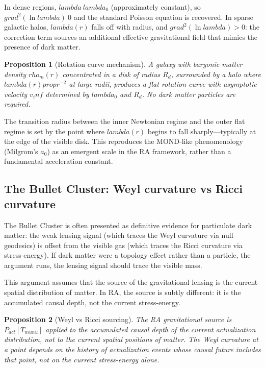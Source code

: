 \documentclass[11pt]{article}
\def\rho{rho}%
\def\mu{mu}%
\def\lambda{lambda}%
\def\nu{nu}%
\def\mathrm#1{#1}%
\def\approx{~}%
\def\infty{inf}%
\def\nabla{grad}%
\def\propto{prop}%
\newtheorem{proposition}{Proposition}
\begin{document}
In dense regions, $\lambda \approx \lambda_0$ (approximately constant), so $\nabla^2(\ln\lambda) \approx 0$ and the standard Poisson equation is recovered. In sparse galactic halos, $\lambda(r)$ falls off with radius, and $\nabla^2(\ln\lambda) > 0$: the correction term sources an additional effective gravitational field that mimics the presence of dark matter.

\begin{proposition}[Rotation curve mechanism]
\label{prop:rotation_curve}
A galaxy with baryonic matter density $\rho_m(r)$ concentrated in a disk of radius $R_d$, surrounded by a halo where $\lambda(r) \propto r^{-2}$ at large radii, produces a flat rotation curve with asymptotic velocity $v_\infty$ determined by $\lambda_0$ and $R_d$. No dark matter particles are required.
\end{proposition}

The transition radius between the inner Newtonian regime and the outer flat regime is set by the point where $\lambda(r)$ begins to fall sharply---typically at the edge of the visible disk. This reproduces the MOND-like phenomenology (Milgrom's $a_0$) as an emergent scale in the RA framework, rather than a fundamental acceleration constant.

\subsection{The Bullet Cluster: Weyl curvature vs Ricci curvature}
\label{sec:bullet_cluster}

The Bullet Cluster is often presented as definitive evidence for particulate dark matter: the weak lensing signal (which traces the Weyl curvature via null geodesics) is offset from the visible gas (which traces the Ricci curvature via stress-energy). If dark matter were a topology effect rather than a particle, the argument runs, the lensing signal should trace the visible mass.

This argument assumes that the source of the gravitational lensing is the current spatial distribution of matter. In RA, the source is subtly different: it is the accumulated causal depth, not the current stress-energy.

\begin{proposition}[Weyl vs Ricci sourcing]
\label{prop:weyl_ricci}
The RA gravitational source is $P_{\mathrm{act}}[T_{\mu\nu}]$ applied to the accumulated causal depth of the current actualization distribution, not to the current spatial positions of matter. The Weyl curvature at a point depends on the history of actualization events whose causal future includes that point, not on the current stress-energy alone.
\end{proposition}
\end{document}
